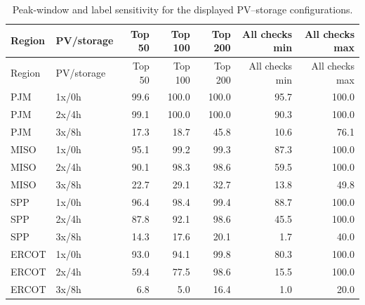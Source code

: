 \begingroup\footnotesize\setlength{\tabcolsep}{3pt}\renewcommand{\arraystretch}{1.15}
\ifrevisionmarkup\color{revisionblue}\fi
\begin{longtable}{llrrrrr}
\caption{Peak-window and label sensitivity for the displayed PV--storage configurations.}\label{tab:pv-peak-window-followup}\\
\toprule Region & PV/storage & Top 50 & Top 100 & Top 200 & All checks min & All checks max \\\midrule\endfirsthead
\toprule Region & PV/storage & Top 50 & Top 100 & Top 200 & All checks min & All checks max \\\midrule\endhead
\bottomrule\endfoot
PJM & 1x/0h & 99.6 & 100.0 & 100.0 & 95.7 & 100.0 \\
PJM & 2x/4h & 99.1 & 100.0 & 100.0 & 90.3 & 100.0 \\
PJM & 3x/8h & 17.3 & 18.7 & 45.8 & 10.6 & 76.1 \\
MISO & 1x/0h & 95.1 & 99.2 & 99.3 & 87.3 & 100.0 \\
MISO & 2x/4h & 90.1 & 98.3 & 98.6 & 59.5 & 100.0 \\
MISO & 3x/8h & 22.7 & 29.1 & 32.7 & 13.8 & 49.8 \\
SPP & 1x/0h & 96.4 & 98.4 & 99.4 & 88.7 & 100.0 \\
SPP & 2x/4h & 87.8 & 92.1 & 98.6 & 45.5 & 100.0 \\
SPP & 3x/8h & 14.3 & 17.6 & 20.1 & 1.7 & 40.0 \\
ERCOT & 1x/0h & 93.0 & 94.1 & 99.8 & 80.3 & 100.0 \\
ERCOT & 2x/4h & 59.4 & 77.5 & 98.6 & 15.5 & 100.0 \\
ERCOT & 3x/8h & 6.8 & 5.0 & 16.4 & 1.0 & 20.0 \\
\end{longtable}
\endgroup
